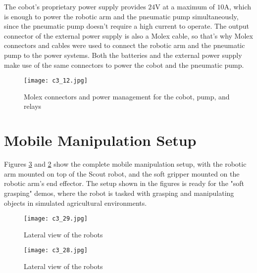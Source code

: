 The cobot's proprietary power supply provides $24$V at a maximum of $10$A, which is enough to power the robotic arm
and the pneumatic pump simultaneously, since the pneumatic pump doesn't require a high current to operate.
The output connector of the external power supply is also a Molex cable, so that's why Molex connectors and cables
were used to connect the robotic arm and the pneumatic pump to the power systems. Both the batteries and the 
external power supply make use of the same connectors to power the cobot and the pneumatic pump.

\begin{figure}[t]
    \centering
    \texttt{[image: c3\_12.jpg]}
    \captionsetup{width=1\linewidth}
    \caption{Molex connectors and power management for the cobot, pump, and relays}
    \label{fig:c3_img12}
\end{figure}



\section{Mobile Manipulation Setup}

Figures \ref{fig:c3_img28} and \ref{fig:c3_img29} show the complete mobile manipulation setup, with the robotic arm
mounted on top of the Scout robot, and the soft gripper mounted on the robotic arm's end effector.
The setup shown in the figures is ready for the "soft grasping" demos, where the robot is tasked with grasping
and manipulating objects in simulated agricultural environments.

\begin{figure}[t]
    \centering
    \texttt{[image: c3\_29.jpg]}
    \captionsetup{width=1\linewidth}
    \caption{Lateral view of the robots}
    \label{fig:c3_img29}
\end{figure}

\begin{figure}[t]
    \centering
    \texttt{[image: c3\_28.jpg]}
    \captionsetup{width=1\linewidth}
    \caption{Lateral view of the robots}
    \label{fig:c3_img28}
\end{figure}